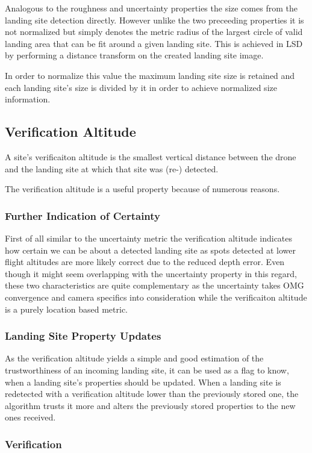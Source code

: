 Analogous to the roughness and uncertainty properties the size comes from the landing site detection directly. However unlike the two preceeding properties it is not normalized but simply denotes the metric radius of the largest circle of valid landing area that can be fit around a given landing site. This is achieved in LSD by performing a distance transform on the created landing site image.

In order to normalize this value the maximum landing site size is retained and each landing site's size is divided by it in order to achieve normalized size information.

\subsection{Verification Altitude}

A site's verificaiton altitude is the smallest vertical distance between the drone and the landing site at which that site was (re-) detected. 

The verification altitude is a useful property because of numerous reasons.
\subsubsection{Further Indication of Certainty}
First of all similar to the uncertainty metric the verification altitude indicates how certain we can be about a detected landing site as spots detected at lower flight altitudes are more likely correct due to the reduced depth error. Even though it might seem overlapping with the uncertainty property in this regard, these two characteristics are quite complementary as the uncertainty takes OMG convergence and camera specifics into consideration while the verificaiton altitude is a purely location based metric.

\subsubsection{Landing Site Property Updates}
As the verification altitude yields a simple and good estimation of the trustworthiness of an incoming landing site, it can be used as a flag to know, when a landing site's properties should be updated. When a landing site is redetected with a verification altitude lower than the previously stored one, the algorithm trusts it more and alters the previously stored properties to the new ones received.

\subsubsection{Verification}

